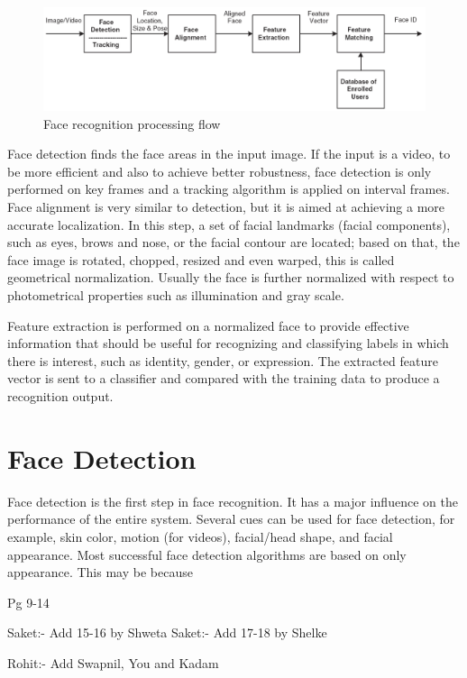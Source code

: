 \documentclass[12pt, twoside]{report}
\begin{document}
\begin{figure}[t]
    \centering
    \includegraphics[width=\textwidth]{img/8_1.png}
    \caption{Face recognition processing flow}
    \label{fig:8_1}
\end{figure}

Face detection finds the face areas in the input image. If the input is a video, to be more efficient and also to achieve better robustness, face detection is only performed on key frames and a tracking algorithm is applied on interval frames. Face alignment is very similar to detection, but it is aimed at achieving a more accurate localization. In this step, a set of facial landmarks (facial components), such as eyes, brows and nose, or the facial contour are located; based on that, the face image is rotated, chopped, resized and even warped, this is called geometrical normalization. Usually the face is further normalized with respect to photometrical properties such as illumination and gray scale.

Feature extraction is performed on a normalized face to provide effective information that should be useful for recognizing and classifying labels in which there is interest, such as identity, gender, or expression. The extracted feature vector is sent to a classifier and compared with the training data to produce a recognition output.

\section{Face Detection}
Face detection is the first step in face recognition. It has a major influence on the performance of the entire system. Several cues can be used for face detection, for example, skin color, motion (for videos), facial/head shape, and facial appearance. Most successful face detection algorithms are based on only appearance. This may be because 

Pg 9-14

Saket:- Add 15-16 by Shweta
Saket:- Add 17-18 by Shelke

Rohit:- Add Swapnil, You and Kadam
\end{document}
